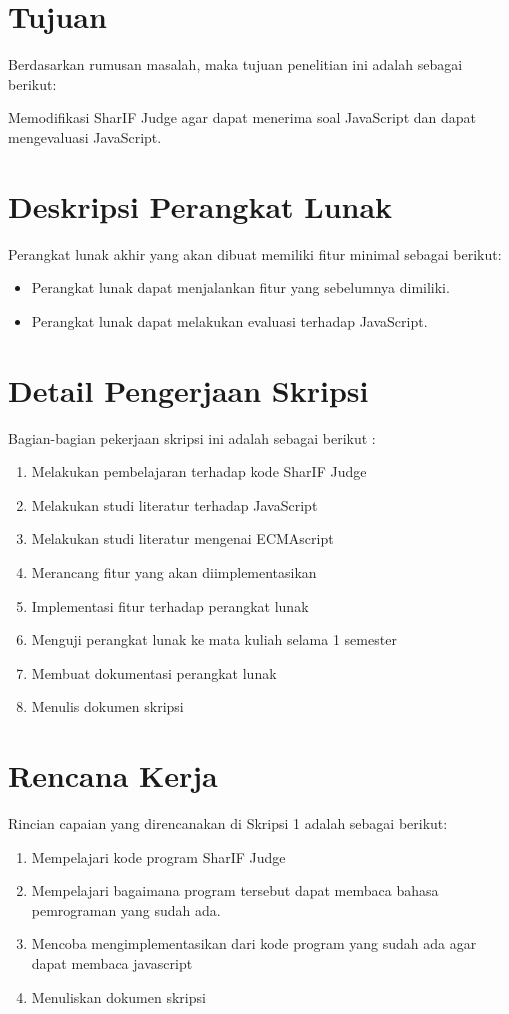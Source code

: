 \documentclass[a4paper,twoside]{article}
\begin{document}
\section{Tujuan}
\label{sec:tujuan}
Berdasarkan rumusan masalah, maka tujuan penelitian ini adalah sebagai berikut:

    Memodifikasi SharIF Judge agar dapat menerima soal JavaScript dan dapat mengevaluasi JavaScript.


\section{Deskripsi Perangkat Lunak}
Perangkat lunak akhir yang akan dibuat memiliki fitur minimal sebagai berikut:
\begin{itemize}
	\item Perangkat lunak dapat menjalankan fitur yang sebelumnya dimiliki.
	\item Perangkat lunak dapat melakukan evaluasi terhadap JavaScript.
		
\end{itemize}

\section{Detail Pengerjaan Skripsi}
Bagian-bagian pekerjaan skripsi ini adalah sebagai berikut :
	\begin{enumerate}
		\item Melakukan pembelajaran terhadap kode SharIF Judge
		\item Melakukan studi literatur terhadap JavaScript
		\item Melakukan studi literatur mengenai ECMAscript
		\item Merancang fitur yang akan diimplementasikan
		\item Implementasi fitur terhadap perangkat lunak
		\item Menguji perangkat lunak ke mata kuliah selama 1 semester
		\item Membuat dokumentasi perangkat lunak
		\item Menulis dokumen skripsi
	\end{enumerate}

\section{Rencana Kerja}
Rincian capaian yang direncanakan di Skripsi 1 adalah sebagai berikut:
\begin{enumerate}
\item Mempelajari kode program SharIF Judge
\item Mempelajari bagaimana program tersebut dapat membaca bahasa pemrograman yang sudah ada.
\item Mencoba mengimplementasikan dari kode program yang sudah ada agar dapat membaca javascript 
\item Menuliskan dokumen skripsi
\end{enumerate}
\end{document}
